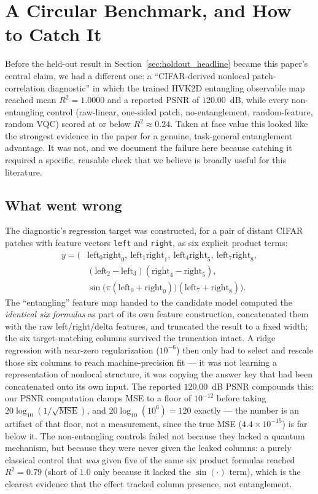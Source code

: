 \documentclass[journal]{IEEEtran}
\begin{document}
\section{A Circular Benchmark, and How to Catch It}
\label{sec:leakage}
Before the held-out result in Section~\ref{sec:holdout_headline} became this paper's central claim, we had a different one: a ``CIFAR-derived nonlocal patch-correlation diagnostic'' in which the trained HVK2D entangling observable map reached mean $R^2=1.0000$ and a reported PSNR of $120.00$~dB, while every non-entangling control (raw-linear, one-sided patch, no-entanglement, random-feature, random VQC) scored at or below $R^2\approx0.24$. Taken at face value this looked like the strongest evidence in the paper for a genuine, task-general entanglement advantage. It was not, and we document the failure here because catching it required a specific, reusable check that we believe is broadly useful for this literature.

\subsection{What went wrong}
The diagnostic's regression target was constructed, for a pair of distant CIFAR patches with feature vectors \texttt{left} and \texttt{right}, as six explicit product terms:
\begin{equation}
\begin{aligned}
y = \bigl(&\mathrm{left}_0\mathrm{right}_0,\ \mathrm{left}_1\mathrm{right}_1,\ \mathrm{left}_4\mathrm{right}_5,\ \mathrm{left}_7\mathrm{right}_8,\\
&(\mathrm{left}_2{-}\mathrm{left}_3)(\mathrm{right}_4{-}\mathrm{right}_5),\\
&\sin\!\bigl(\pi(\mathrm{left}_0{+}\mathrm{right}_0)\bigr)(\mathrm{left}_7{+}\mathrm{right}_8)\bigr).
\end{aligned}
\end{equation}
The ``entangling'' feature map handed to the candidate model computed the \emph{identical six formulas} as part of its own feature construction, concatenated them with the raw left/right/delta features, and truncated the result to a fixed width; the six target-matching columns survived the truncation intact. A ridge regression with near-zero regularization ($10^{-6}$) then only had to select and rescale those six columns to reach machine-precision fit --- it was not learning a representation of nonlocal structure, it was copying the answer key that had been concatenated onto its own input. The reported $120.00$~dB PSNR compounds this: our PSNR computation clamps MSE to a floor of $10^{-12}$ before taking $20\log_{10}(1/\sqrt{\mathrm{MSE}})$, and $20\log_{10}(10^{6})=120$ exactly --- the number is an artifact of that floor, not a measurement, since the true MSE ($4.4\times10^{-15}$) is far below it. The non-entangling controls failed not because they lacked a quantum mechanism, but because they were never given the leaked columns: a purely classical control that \emph{was} given five of the same six product formulas reached $R^2=0.79$ (short of $1.0$ only because it lacked the $\sin(\cdot)$ term), which is the clearest evidence that the effect tracked column presence, not entanglement.
\end{document}
